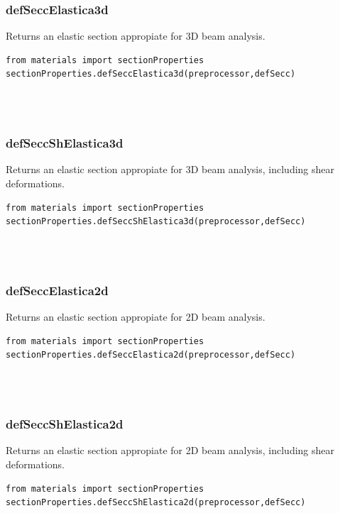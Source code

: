 \subsubsection{defSeccElastica3d}
\noindent Returns an elastic section appropiate for 3D beam analysis.
\begin{verbatim}
from materials import sectionProperties
sectionProperties.defSeccElastica3d(preprocessor,defSecc)
\end{verbatim}
\begin{paramFuncTable}
\preprocessor{} \\
 \\
\end{paramFuncTable}


\subsubsection{defSeccShElastica3d}
\noindent Returns an elastic section appropiate for 3D beam analysis, including shear deformations.
\begin{verbatim}
from materials import sectionProperties
sectionProperties.defSeccShElastica3d(preprocessor,defSecc)
\end{verbatim}
\begin{paramFuncTable}
\preprocessor{} \\
 \\
\end{paramFuncTable}


\subsubsection{defSeccElastica2d}
\noindent Returns an elastic section appropiate for 2D beam analysis.
\begin{verbatim}
from materials import sectionProperties
sectionProperties.defSeccElastica2d(preprocessor,defSecc)
\end{verbatim}
\begin{paramFuncTable}
\preprocessor{} \\
 \\
\end{paramFuncTable}


\subsubsection{defSeccShElastica2d}
\noindent Returns an elastic section appropiate for 2D beam analysis, including shear deformations.
\begin{verbatim}
from materials import sectionProperties
sectionProperties.defSeccShElastica2d(preprocessor,defSecc)
\end{verbatim}
\begin{paramFuncTable}
\preprocessor{} \\
 \\
\end{paramFuncTable}


